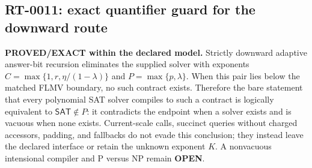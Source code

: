\subsection*{RT-0011: exact quantifier guard for the downward route}
\textbf{PROVED/EXACT within the declared model.}
Strictly downward adaptive answer-bit recursion eliminates the supplied
solver with exponents
$C=\max\{1,r,\eta/(1-\lambda)\}$ and $P=\max\{p,\lambda\}$.
When this pair lies below the matched FLMV boundary, no such contract exists.
Therefore the bare statement that every polynomial SAT solver compiles to
such a contract is logically equivalent to $\mathsf{SAT}\notin P$: it
contradicts the endpoint when a solver exists and is vacuous when none exists.
Current-scale calls, succinct queries without charged accessors, padding, and
fallbacks do not evade this conclusion; they instead leave the declared
interface or retain the unknown exponent $K$.  A nonvacuous intensional
compiler and P versus NP remain \textbf{OPEN}.

